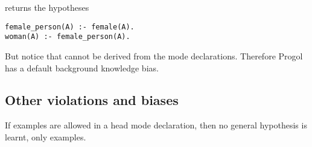 returns the hypotheses
\begin{lstlisting}
female_person(A) :- female(A).
woman(A) :- female_person(A).
\end{lstlisting}
But notice that  cannot be derived from the mode declarations. Therefore Progol has a default background knowledge bias.

\subsection{Other violations and biases}
If examples are allowed in a head mode declaration, then no general hypothesis is learnt, only examples.